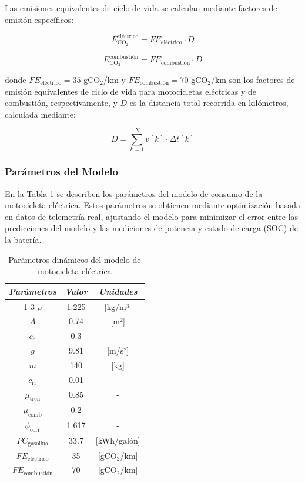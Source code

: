 Las emisiones equivalentes de ciclo de vida se calculan mediante factores de emisión específicos:

\begin{equation} 
    E_{\mathrm{CO}_2}^{\mathrm{eléctrico}} = FE_{\mathrm{eléctrico}} \cdot D
    \label{emisiones_electrico}
\end{equation}

\begin{equation} 
    E_{\mathrm{CO}_2}^{\mathrm{combustión}} = FE_{\mathrm{combustión}} \cdot D
    \label{emisiones_combustion}
\end{equation}

donde $FE_{\mathrm{eléctrico}} = 35$ gCO$_2$/km y $FE_{\mathrm{combustión}} = 70$ gCO$_2$/km son los factores de emisión equivalentes de ciclo de vida para motocicletas eléctricas y de combustión, respectivamente, y $D$ es la distancia total recorrida en kilómetros, calculada mediante:

\begin{equation} 
    D = \sum_{k=1}^{N} v[k] \cdot \Delta t[k]
    \label{distancia}
\end{equation}

\subsubsection{Parámetros del Modelo}

En la Tabla \ref{tabmot} se describen los parámetros del modelo de consumo de la motocicleta eléctrica. Estos parámetros se obtienen mediante optimización basada en datos de telemetría real, ajustando el modelo para minimizar el error entre las predicciones del modelo y las mediciones de potencia y estado de carga (SOC) de la batería.

\begin{table}[htbp]
\caption{Parámetros dinámicos del modelo de motocicleta eléctrica}
\begin{center}
\begin{tabular}{|c|c|c|}
\hline
\textbf{\textit{Parámetros}} & \textbf{\textit{Valor}} & \textbf{\textit{Unidades}}\\
\cline{1-3} 
\hline
$\rho$ & 1.225 & [kg/m³] \\
$A$ & 0.74 & [m²] \\
$c_{\mathrm{d}}$ & 0.3 & -\\
$g$ & 9.81 & [m/s²] \\
$m$ & 140 & [kg] \\
$c_{\mathrm{rr}}$ & 0.01 & -\\
$\mu_{\mathrm{tren}}$ & 0.85 & -\\
$\mu_{\mathrm{comb}}$ & 0.2 & -\\
$\phi_{\mathrm{corr}}$ & 1.617 & -\\
$PC_{\mathrm{gasolina}}$ & 33.7 & [kWh/galón] \\
$FE_{\mathrm{eléctrico}}$ & 35 & [gCO$_2$/km] \\
$FE_{\mathrm{combustión}}$ & 70 & [gCO$_2$/km] \\
\hline
\end{tabular}
\label{tabmot}
\end{center}
\end{table}

